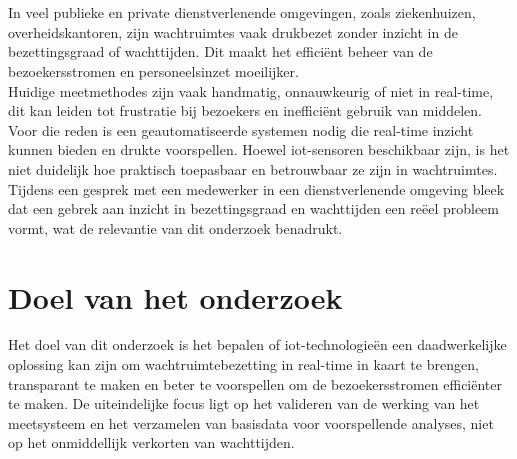 




\section{}%
\label{sec:probleemstelling}
In veel publieke en private dienstverlenende omgevingen, zoals ziekenhuizen, overheidskantoren, zijn wachtruimtes vaak drukbezet zonder inzicht in de bezettingsgraad of wachttijden. Dit maakt het efficiënt beheer van de bezoekersstromen en personeelsinzet moeilijker. \\  

Huidige meetmethodes zijn vaak handmatig, onnauwkeurig of niet in real-time, dit kan leiden tot frustratie bij bezoekers en inefficiënt gebruik van middelen. Voor die reden is een geautomatiseerde systemen nodig die real-time inzicht kunnen bieden en drukte voorspellen. Hoewel \gls{iot}-sensoren beschikbaar zijn, is het niet duidelijk hoe praktisch toepasbaar en betrouwbaar ze zijn in wachtruimtes. Tijdens een gesprek met een medewerker in een dienstverlenende omgeving bleek dat een gebrek aan inzicht in bezettingsgraad en wachttijden een reëel probleem vormt, wat de relevantie van dit onderzoek benadrukt.

\section{Doel van het onderzoek}
Het doel van dit onderzoek is het bepalen of \gls{iot}-technologieën een daadwerkelijke oplossing kan zijn om wachtruimtebezetting in real-time in kaart te brengen, transparant te maken en beter te voorspellen om de bezoekersstromen efficiënter te maken. De uiteindelijke focus ligt op het valideren van de werking van het meetsysteem en het verzamelen van basisdata voor voorspellende analyses, niet op het onmiddellijk verkorten van wachttijden.

